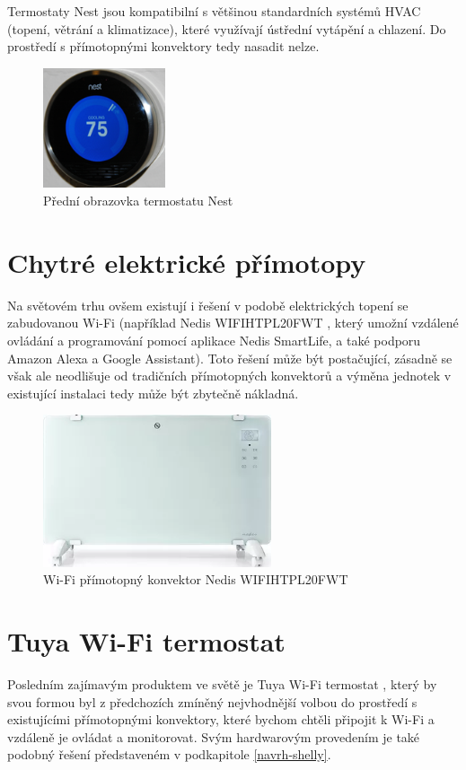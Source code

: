 Termostaty Nest jsou kompatibilní s většinou standardních systémů HVAC (topení, větrání a klimatizace), které využívají ústřední vytápění a chlazení. Do prostředí s přímotopnými konvektory tedy nasadit nelze.

\begin{figure}[hbt]
\centering
\includegraphics[width=0.32\textwidth]{obrazky-figures/nest.png}
\caption{Přední obrazovka termostatu Nest}
\end{figure}

\pagebreak

\section{Chytré elektrické přímotopy}
Na světovém trhu ovšem existují i řešení v podobě elektrických topení se zabudovanou Wi-Fi (například Nedis WIFIHTPL20FWT \cite{nedis}, který umožní vzdálené ovládání a programování pomocí aplikace Nedis SmartLife, a také podporu Amazon Alexa a Google Assistant). Toto řešení může být postačující, zásadně se však ale neodlišuje od tradičních přímotopných konvektorů a výměna jednotek v existující instalaci tedy může být zbytečně nákladná.

\begin{figure}[hbt]
\centering
\includegraphics[width=0.6\textwidth]{obrazky-figures/nedis.png}
\caption{Wi-Fi přímotopný konvektor Nedis WIFIHTPL20FWT}
\end{figure}


\section{Tuya Wi-Fi termostat}
Posledním zajímavým produktem ve světě je Tuya Wi-Fi termostat \cite{tuyaterm}, který by svou formou byl z předchozích zmíněný nejvhodnější volbou do prostředí s existujícími přímotopnými konvektory, které bychom chtěli připojit k Wi-Fi a vzdáleně je ovládat a monitorovat. Svým hardwarovým provedením je také podobný řešení představeném v podkapitole \ref{navrh-shelly}.

